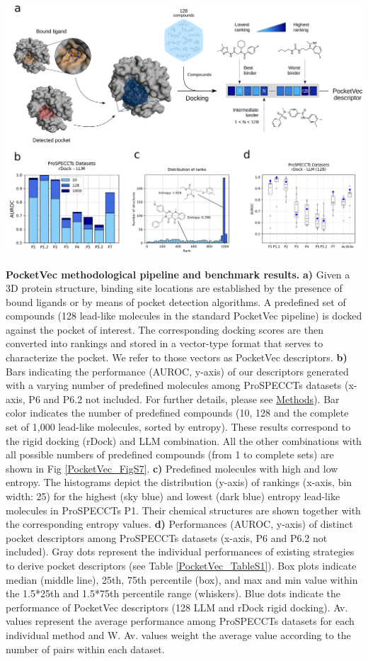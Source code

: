 \begin{Figure_modified}
  \centering
  \includegraphics[width=\linewidth]{figures/PocketVec/Main/Fig1.png}
  \caption{
    \textbf{PocketVec methodological pipeline and benchmark results.} 
    \textbf{a)} Given a 3D protein structure, binding site locations are established by the presence of bound ligands or by means of pocket detection algorithms. A predefined set of compounds (128 lead-like molecules in the standard PocketVec pipeline) is docked against the pocket of interest. The corresponding docking scores are then converted into rankings and stored in a vector-type format that serves to characterize the pocket. We refer to those vectors as PocketVec descriptors.
    \textbf{b)} Bars indicating the performance (AUROC, y-axis) of our descriptors generated with a varying number of predefined molecules among ProSPECCTs datasets (x-axis, P6 and P6.2 not included. For further details, please see \hyperref[PocketVec_Methods]{Methods}). Bar color indicates the number of predefined compounds (10, 128 and the complete set of 1,000 lead-like molecules, sorted by entropy). These results correspond to the rigid docking (rDock) and LLM combination. All the other combinations with all possible numbers of predefined compounds (from 1 to complete sets) are shown in Fig \ref{PocketVec_FigS7}.
    \textbf{c)} Predefined molecules with high and low entropy. The histograms depict the distribution (y-axis) of rankings (x-axis, bin width: 25) for the highest (sky blue) and lowest (dark blue) entropy lead-like molecules in ProSPECCTs P1. Their chemical structures are shown together with the corresponding entropy values.
    \textbf{d)} Performances (AUROC, y-axis) of distinct pocket descriptors among ProSPECCTs datasets (x-axis, P6 and P6.2 not included). Gray dots represent the individual performances of existing strategies to derive pocket descriptors (see Table \ref{PocketVec_TableS1}). Box plots indicate median (middle line), 25th, 75th percentile (box), and max and min value within the 1.5*25th and 1.5*75th percentile range (whiskers). Blue dots indicate the performance of PocketVec descriptors (128 LLM and rDock rigid docking). Av. values represent the average performance among ProSPECCTs datasets for each individual method and W. Av. values weight the average value according to the number of pairs within each dataset.
}
\end{Figure_modified}
